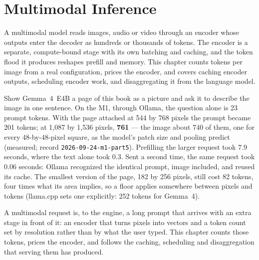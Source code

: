 \chapter{Multimodal Inference}\label{ch:multimodal}

\begin{ChapterIntent}
A multimodal model reads images, audio or video through an encoder whose
outputs enter the decoder as hundreds or thousands of tokens. The encoder is a
separate, compute-bound stage with its own batching and caching, and the token
flood it produces reshapes prefill and memory. This chapter counts tokens per
image from a real configuration, prices the encoder, and covers caching
encoder outputs, scheduling encoder work, and disaggregating it from the
language model.
\end{ChapterIntent}


Show Gemma~4~E4B a page of this book as a picture and ask it to describe the
image in one sentence. On the M1, through Ollama, the question alone is 23
prompt tokens. With the page attached at 544 by 768 pixels the prompt became
201 tokens; at 1,087 by 1,536 pixels, \textbf{761} --- the image about 740 of
them, one for every 48-by-48-pixel square, as the model's patch size and pooling
predict (measured; record \texttt{2026-09-24-m1-part5}). Prefilling the larger
request took 7.9 seconds, where the text alone took 0.3. Sent a second time,
the same request took 0.06 seconds: Ollama recognized the identical prompt,
image included, and reused its cache. The smallest version of the page, 182 by
256 pixels, still cost 82 tokens, four times what its area implies, so a floor
applies somewhere between pixels and tokens (llama.cpp sets one explicitly: 252
tokens for Gemma~4).

A multimodal request is, to the engine, a long prompt that arrives with an
extra stage in front of it: an encoder that turns pixels into vectors and a
token count set by resolution rather than by what the user typed. This chapter
counts those tokens, prices the encoder, and follows the caching, scheduling
and disaggregation that serving them has produced.


